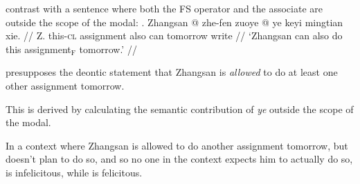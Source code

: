 \documentclass[11pt]{article}
\newcommand{\F}{\ensuremath{_{\mathrm{F}}}}
\begin{document}
\Last contrast with a sentence where both the FS operator and the associate are outside the scope of the modal:
\ex. \begingl
\gla Zhangsan \nogloss{[} @ zhe-fen zuoye @ \nogloss{]\F{}} ye keyi mingtian xie. //
  \glb Z. this-\textsc{cl} assignment also can tomorrow write //
  \glft `Zhangsan can also do this assignment\F{} tomorrow.' //
\endgl

\Last presupposes the deontic statement that Zhangsan is \emph{allowed} to do at least one other assignment tomorrow.

This is derived by calculating the semantic contribution of \emph{ye} outside the scope of the modal.

In a context where Zhangsan is allowed to do another assignment tomorrow, but doesn't plan to do so, and so no one in the context expects him to actually do so, \LLast is infelicitous, while \Last is felicitous.




%
%
\end{document}
